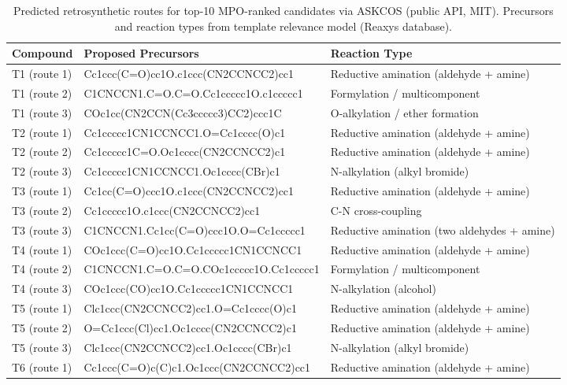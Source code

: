 
\begin{table}[htbp]
\centering
\caption{Predicted retrosynthetic routes for top-10 MPO-ranked candidates via ASKCOS (public API, MIT). Precursors and reaction types from template relevance model (Reaxys database).
\label{tab:sm_s20_retrosynthesis}}
\scriptsize
\begin{tabular}{l l l}
\toprule
Compound & Proposed Precursors & Reaction Type \\
\midrule
T1 (route 1) & Cc1ccc(C=O)cc1O.c1ccc(CN2CCNCC2)cc1 & Reductive amination (aldehyde + amine) \\
T1 (route 2) & C1CNCCN1.C=O.C=O.Cc1ccccc1O.c1ccccc1 & Formylation / multicomponent \\
T1 (route 3) & COc1cc(CN2CCN(Cc3ccccc3)CC2)ccc1C & O-alkylation / ether formation \\
T2 (route 1) & Cc1ccccc1CN1CCNCC1.O=Cc1cccc(O)c1 & Reductive amination (aldehyde + amine) \\
T2 (route 2) & Cc1ccccc1C=O.Oc1cccc(CN2CCNCC2)c1 & Reductive amination (aldehyde + amine) \\
T2 (route 3) & Cc1ccccc1CN1CCNCC1.Oc1cccc(CBr)c1 & N-alkylation (alkyl bromide) \\
T3 (route 1) & Cc1cc(C=O)ccc1O.c1ccc(CN2CCNCC2)cc1 & Reductive amination (aldehyde + amine) \\
T3 (route 2) & Cc1ccccc1O.c1ccc(CN2CCNCC2)cc1 & C-N cross-coupling \\
T3 (route 3) & C1CNCCN1.Cc1cc(C=O)ccc1O.O=Cc1ccccc1 & Reductive amination (two aldehydes + amine) \\
T4 (route 1) & COc1ccc(C=O)cc1O.Cc1ccccc1CN1CCNCC1 & Reductive amination (aldehyde + amine) \\
T4 (route 2) & C1CNCCN1.C=O.C=O.COc1ccccc1O.Cc1ccccc1 & Formylation / multicomponent \\
T4 (route 3) & COc1ccc(CO)cc1O.Cc1ccccc1CN1CCNCC1 & N-alkylation (alcohol) \\
T5 (route 1) & Clc1ccc(CN2CCNCC2)cc1.O=Cc1cccc(O)c1 & Reductive amination (aldehyde + amine) \\
T5 (route 2) & O=Cc1ccc(Cl)cc1.Oc1cccc(CN2CCNCC2)c1 & Reductive amination (aldehyde + amine) \\
T5 (route 3) & Clc1ccc(CN2CCNCC2)cc1.Oc1cccc(CBr)c1 & N-alkylation (alkyl bromide) \\
T6 (route 1) & Cc1ccc(C=O)c(C)c1.Oc1ccc(CN2CCNCC2)cc1 & Reductive amination (aldehyde + amine) \\

\end{tabular}
\end{table}
